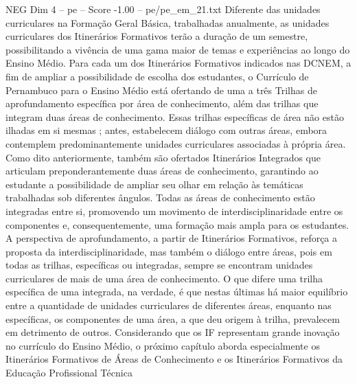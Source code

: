 \begin{textsample}{NEG Dim 4 – pe – Score -1.00 – pe/pe\_em\_21.txt}
Diferente das unidades curriculares na Formação Geral Básica, trabalhadas anualmente, as unidades curriculares dos Itinerários Formativos terão a duração de um semestre, possibilitando a vivência de uma gama maior de temas e experiências ao longo do Ensino Médio.
Para cada um dos Itinerários Formativos indicados nas DCNEM, a fim de ampliar a possibilidade de escolha dos estudantes, o Currículo de Pernambuco para o Ensino Médio está ofertando de uma a três Trilhas de aprofundamento específica por área de conhecimento, além das trilhas que integram duas áreas de conhecimento.
Essas trilhas específicas de área não estão ilhadas em si mesmas ; antes, estabelecem diálogo com outras áreas, embora contemplem predominantemente unidades curriculares associadas à própria área.
Como dito anteriormente, também são ofertados Itinerários Integrados que articulam preponderantemente duas áreas de conhecimento, garantindo ao estudante a possibilidade de ampliar seu olhar em relação às temáticas trabalhadas sob diferentes ângulos.
Todas as áreas de conhecimento estão integradas entre si, promovendo um movimento de interdisciplinaridade entre os componentes e, consequentemente, uma formação mais ampla para os estudantes.
A perspectiva de aprofundamento, a partir de Itinerários Formativos, reforça a proposta da interdisciplinaridade, mas também o diálogo entre áreas, pois em todas as trilhas, específicas ou integradas, sempre se encontram unidades curriculares de mais de uma área de conhecimento.
O que difere uma trilha específica de uma integrada, na verdade, é que nestas últimas há maior equilíbrio entre a quantidade de unidades curriculares de diferentes áreas, enquanto nas específicas, os componentes de uma área, a que deu origem à trilha, prevalecem em detrimento de outros.
Considerando que os IF representam grande inovação no currículo do Ensino Médio, o próximo capítulo aborda especialmente os Itinerários Formativos de Áreas de Conhecimento e os Itinerários Formativos da Educação Profissional Técnica

\end{textsample}
